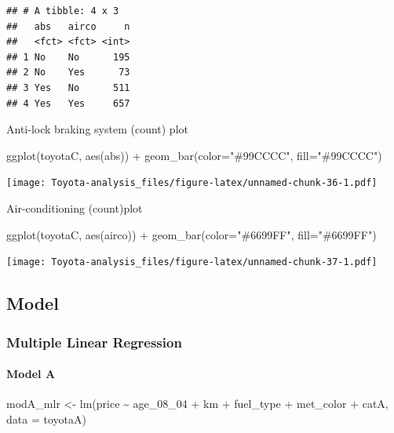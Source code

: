 \documentclass[
]{article}
\newenvironment{Shaded}{\begin{snugshade}}{\end{snugshade}}
\newcommand{\AttributeTok}[1]{\textcolor[rgb]{0.77,0.63,0.00}{#1}}
\newcommand{\FunctionTok}[1]{\textcolor[rgb]{0.00,0.00,0.00}{#1}}
\newcommand{\NormalTok}[1]{#1}
\newcommand{\OtherTok}[1]{\textcolor[rgb]{0.56,0.35,0.01}{#1}}
\newcommand{\SpecialCharTok}[1]{\textcolor[rgb]{0.00,0.00,0.00}{#1}}
\newcommand{\StringTok}[1]{\textcolor[rgb]{0.31,0.60,0.02}{#1}}
\begin{document}
\begin{verbatim}
## # A tibble: 4 x 3
##   abs   airco     n
##   <fct> <fct> <int>
## 1 No    No      195
## 2 No    Yes      73
## 3 Yes   No      511
## 4 Yes   Yes     657
\end{verbatim}

Anti-lock braking system (count) plot

\begin{Shaded}
\begin{Highlighting}[]
\FunctionTok{ggplot}\NormalTok{(toyotaC, }\FunctionTok{aes}\NormalTok{(abs)) }\SpecialCharTok{+} \FunctionTok{geom\_bar}\NormalTok{(}\AttributeTok{color=}\StringTok{"\#99CCCC"}\NormalTok{, }\AttributeTok{fill=}\StringTok{"\#99CCCC"}\NormalTok{) }
\end{Highlighting}
\end{Shaded}

\texttt{[image: Toyota-analysis\_files/figure-latex/unnamed-chunk-36-1.pdf]}

Air-conditioning (count)plot

\begin{Shaded}
\begin{Highlighting}[]
\FunctionTok{ggplot}\NormalTok{(toyotaC, }\FunctionTok{aes}\NormalTok{(airco)) }\SpecialCharTok{+} \FunctionTok{geom\_bar}\NormalTok{(}\AttributeTok{color=}\StringTok{"\#6699FF"}\NormalTok{, }\AttributeTok{fill=}\StringTok{"\#6699FF"}\NormalTok{)}
\end{Highlighting}
\end{Shaded}

\texttt{[image: Toyota-analysis\_files/figure-latex/unnamed-chunk-37-1.pdf]}

\hypertarget{model-1}{%
\subsection{Model}\label{model-1}}

\hypertarget{multiple-linear-regression}{%
\subsubsection{Multiple Linear
Regression}\label{multiple-linear-regression}}

\hypertarget{model-a-7}{%
\paragraph{Model A}\label{model-a-7}}

\begin{Shaded}
\begin{Highlighting}[]
\NormalTok{modA\_mlr }\OtherTok{\textless{}{-}} \FunctionTok{lm}\NormalTok{(price }\SpecialCharTok{\textasciitilde{}}\NormalTok{ age\_08\_04 }\SpecialCharTok{+}\NormalTok{ km }\SpecialCharTok{+}\NormalTok{ fuel\_type }\SpecialCharTok{+} 
\NormalTok{                met\_color }\SpecialCharTok{+}\NormalTok{ catA, }\AttributeTok{data =}\NormalTok{ toyotaA)}
\end{Highlighting}
\end{Shaded}
\end{document}
